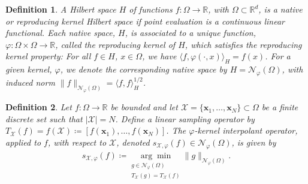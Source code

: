\documentclass[pdflatex,sn-mathphys-num]{sn-jnl}%
\theoremstyle{thmstyleone}%
\theoremstyle{thmstyletwo}%
\theoremstyle{thmstylethree}%
\newtheorem{definition}{Definition}%
\begin{document}
\begin{definition}\label{def: native space}
    A Hilbert space \(H\) of functions \(f:\Omega\rightarrow\mathbb{R}\), with \(\Omega\subset\mathbb{R}^d\), is a \textit{native} or \emph{reproducing kernel Hilbert space} if point evaluation is a continuous linear functional. Each native space, \(H\), is associated to a unique function, \(\varphi:\Omega\times\Omega\rightarrow\mathbb{R}\), called the \textit{reproducing kernel} of \(H\), which satisfies the reproducing kernel property: For all \(f\in H\), \(x\in\Omega\), we have \(\langle f,\varphi(\cdot,x)\rangle_{H}=f(x)\). For a given kernel, \(\varphi\), we denote the corresponding native space by \(H=\mathcal{N}_{\varphi}(\Omega)\), with induced norm \(\|f\|_{\mathcal{N}_{\varphi}(\Omega)}=\langle f,f\rangle_H^{1/2}\).
\end{definition}
\begin{definition}\label{def:restricted kernel interpolant}
   Let \(f:\Omega\rightarrow\mathbb{R}\) be bounded and let \(\mathcal{X}=\{\mathbf{x}_1,\dots,\mathbf{x}_N\}\subset \Omega\) be a finite discrete set such that \(|\mathcal{X}|=N\). Define a linear sampling operator by \(T_{\mathcal{X}}(f)=f(\mathcal{X})\coloneqq[f(\mathbf{x}_1),\dots,f(\mathbf{x}_N)]\). The \(\varphi\)-\emph{kernel interpolant operator}, applied to \(f\), with respect to \(\mathcal{X}\), denoted \(s_{\mathcal{X},\varphi}(f)\in\mathcal{N}_{\varphi}(\Omega)\), is given by
   \begin{align}
       s_{\mathcal{X},\varphi}(f)\coloneqq\underset{\substack{g\in\mathcal{N}_{\varphi}(\Omega)\\T_{\mathcal{X}}(g)=T_{\mathcal{X}}(f)}}{\arg\min}\|g\|_{\mathcal{N}_{\varphi}(\Omega)}.\nonumber
   \end{align}
\end{definition}
\end{document}
